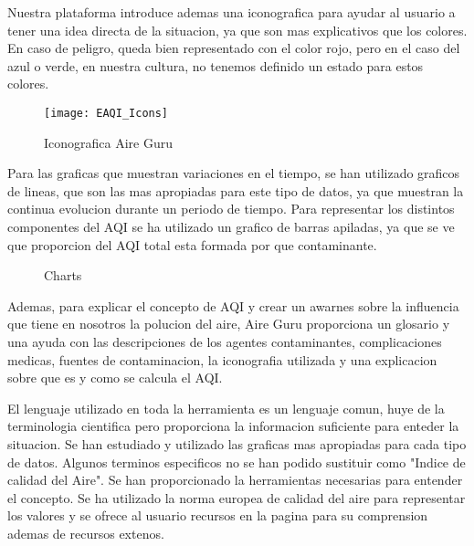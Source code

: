 Nuestra plataforma introduce ademas una iconografica para ayudar al usuario a tener una idea directa de la situacion, ya que son mas 
explicativos que los colores. En caso de peligro, queda bien representado con el color rojo, pero en el caso del azul o verde, en nuestra cultura, no
tenemos definido un estado para estos colores.\\
\begin{figure}[ht]
    \centering
    \texttt{[image: EAQI\_Icons]}
    \caption{Iconografica Aire Guru}
\end{figure}

Para las graficas que muestran variaciones en el tiempo, se han utilizado graficos de lineas, que son las mas apropiadas para este tipo de datos,
ya que muestran la continua evolucion durante un periodo de tiempo. Para representar los distintos componentes del AQI se ha utilizado un
grafico de barras apiladas, ya que se ve que proporcion del AQI total esta formada por que contaminante.\\
\begin{figure}[ht]
    \centering
     \hfill
 
    \caption{Charts}
\end{figure}

Ademas, para explicar el concepto de AQI y crear un awarnes sobre la influencia que tiene en nosotros la polucion del aire, Aire Guru proporciona un 
glosario y una ayuda con las descripciones de los agentes contaminantes, complicaciones medicas, fuentes de contaminacion, la iconografia utilizada y
una explicacion sobre que es y como se calcula el AQI.\\

 
\begin{itemize}
    \done El lenguaje utilizado en toda la herramienta es un lenguaje comun, huye de la terminologia cientifica pero proporciona la informacion
    suficiente para enteder la situacion.
    \done Se han estudiado y utilizado las graficas mas apropiadas para cada tipo de datos.
    \crossed Algunos terminos especificos no se han podido sustituir como "Indice de calidad del Aire".
    \done Se han proporcionado la herramientas necesarias para entender el concepto. Se ha utilizado la norma europea de calidad del aire para 
    representar los valores y se ofrece al usuario recursos en la pagina para su comprension ademas de recursos extenos.
    
\end{itemize}
 

\newpage